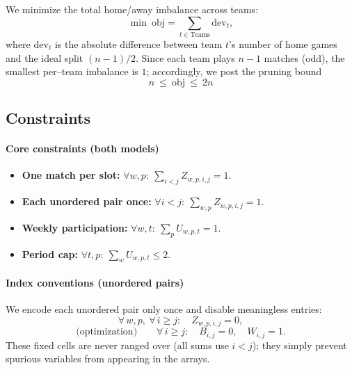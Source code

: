 \documentclass{article}
\begin{document}
We minimize the total home/away imbalance across teams:
\[
  \min\ \mathrm{obj} = \sum_{t\in\text{Teams}} \mathrm{dev}_t,
\]
where \(\mathrm{dev}_t\) is the absolute difference between team \(t\)'s number
of home games and the ideal split \((n-1)/2\). Since each team plays \(n-1\)
matches (odd), the smallest per–team imbalance is \(1\); accordingly, we post
the pruning bound
\[
  n \ \le\ \mathrm{obj}\ \le\ 2n
\]


\subsection{Constraints}
\label{subsec:cp-constraints}

\paragraph{Core constraints (both models)}
\begin{itemize}\setlength{\itemsep}{2pt}
  \item \textbf{One match per slot:}
        \(\forall w,p:\ \sum_{i<j} Z_{w,p,i,j}=1\).
  \item \textbf{Each unordered pair once:}
        \(\forall i<j:\ \sum_{w,p} Z_{w,p,i,j}=1\).
  \item \textbf{Weekly participation:}
        \(\forall w,t:\ \sum_{p} U_{w,p,t}=1\).
  \item \textbf{Period cap:}
        \(\forall t,p:\ \sum_{w} U_{w,p,t}\le 2\).
\end{itemize}

\paragraph{Index conventions (unordered pairs)}
We encode each unordered pair only once and disable meaningless entries:
\[
  \forall\,w,p,\ \forall\,i\ge j:\quad Z_{w,p,i,j}=0,
\]
\[
  \text{(optimization)}\qquad
  \forall\,i\ge j:\quad B_{i,j}=0,\quad W_{i,j}=1.
\]
These fixed cells are never ranged over (all sums use \(i<j\)); they simply
prevent spurious variables from appearing in the arrays.
\end{document}
